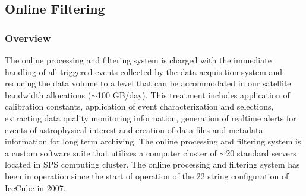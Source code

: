 

\subsection{Online Filtering}

\subsubsection{Overview}

The online processing and filtering system is charged with the immediate handling of all triggered events collected by the data
acquisition system and reducing the data volume to a level that can be
accommodated in our satellite bandwidth allocations ($\sim$100 GB/day).
This treatment includes application of calibration constants, application of event characterization and selections,  
extracting data quality monitoring information, generation of realtime alerts for events of astrophysical interest
and creation of data files and metadata information for long term archiving.  The online processing and filtering system
is a custom software suite that utilizes a computer cluster of $\sim$20 standard servers located in SPS computing cluster.
The online processing and filtering system has been in operation since the
start of operation of the 22 string configuration of IceCube in 2007.

